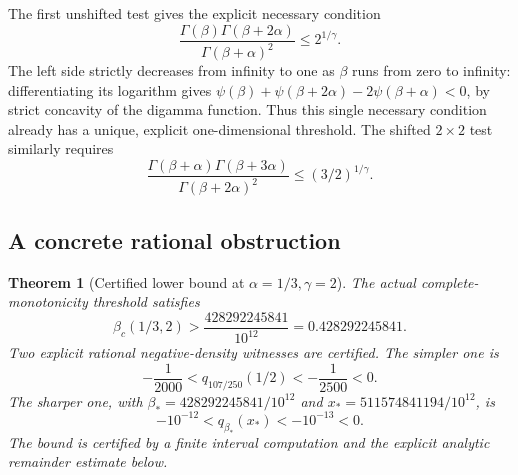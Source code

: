 \documentclass[11pt,a4paper]{article}
\newtheorem{theorem}{Theorem}[section]
\theoremstyle{definition}
\theoremstyle{remark}
\numberwithin{equation}{section}
\begin{document}
The first unshifted test gives the explicit necessary condition
\begin{equation}\label{spec:variance-bound}
 \frac{\Gamma(\beta)\Gamma(\beta+2\alpha)}
      {\Gamma(\beta+\alpha)^2}\le2^{1/\gamma}.
\end{equation}
The left side strictly decreases from infinity to one as \(\beta\)
runs from zero to infinity: differentiating its logarithm gives
\(\psi(\beta)+\psi(\beta+2\alpha)-2\psi(\beta+\alpha)<0\), by
strict concavity of the digamma function.  Thus this single necessary
condition already has a unique, explicit one-dimensional threshold.
The shifted \(2\times2\) test similarly requires
\[
 \frac{\Gamma(\beta+\alpha)\Gamma(\beta+3\alpha)}
      {\Gamma(\beta+2\alpha)^2}\le(3/2)^{1/\gamma}.
\]

\subsection{A concrete rational obstruction}

\begin{theorem}[Certified lower bound at \(\alpha=1/3,\gamma=2\)]
\label{spec:rational-witness}
The actual complete-monotonicity threshold satisfies
\[
       \beta_c(1/3,2)>
            \frac{428292245841}{10^{12}}=0.428292245841.
\]
Two explicit rational negative-density witnesses are certified.  The
simpler one is
\begin{equation}\label{spec:q-negative}
 -\frac1{2000}<q_{107/250}(1/2)<-\frac1{2500}<0.
\end{equation}
The sharper one, with
\(\beta_*=428292245841/10^{12}\) and
\(x_*=511574841194/10^{12}\), is
\[
                 -10^{-12}<q_{\beta_*}(x_*)<-10^{-13}<0.
\]
The bound is certified by a finite interval computation and the
explicit analytic remainder estimate below.
\end{theorem}
\end{document}
